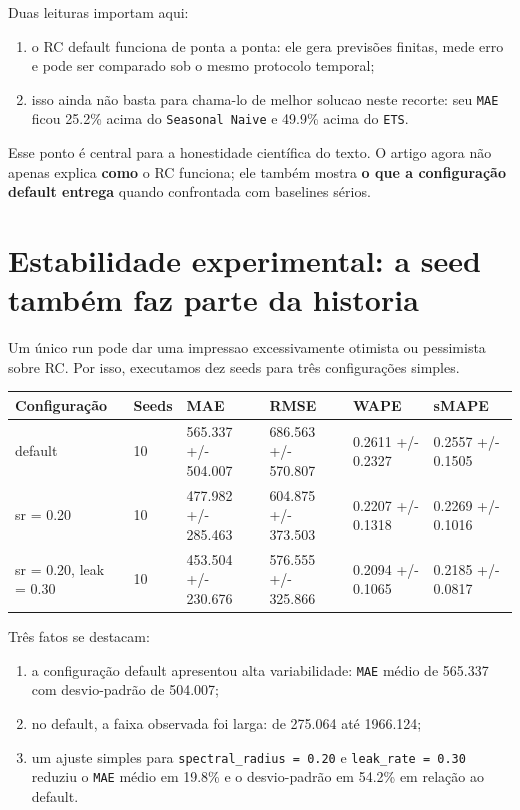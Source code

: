 \documentclass[12pt]{article}
\providecommand{\tightlist}{%
              \setlength{\itemsep}{0pt}\setlength{\parskip}{0pt}}
\begin{document}
Duas leituras importam aqui:

\begin{enumerate}
\def\labelenumi{\arabic{enumi}.}
\tightlist
\item
  o RC default funciona de ponta a ponta: ele gera previsões finitas, mede erro e pode ser comparado sob o mesmo protocolo temporal;
\item
  isso ainda não basta para chama-lo de melhor solucao neste recorte: seu \texttt{MAE} ficou 25.2\% acima do \texttt{Seasonal\ Naive} e 49.9\% acima do \texttt{ETS}.
\end{enumerate}

Esse ponto é central para a honestidade científica do texto. O artigo agora não apenas explica \textbf{como} o RC funciona; ele também mostra \textbf{o que a configuração default entrega} quando confrontada com baselines sérios.

\section{Estabilidade experimental: a seed também faz parte da historia}\label{11-estabilidade-experimental-a-seed-tambuxe9m-faz-parte-da-historia}

Um único run pode dar uma impressao excessivamente otimista ou pessimista sobre RC. Por isso, executamos dez seeds para três configurações simples.

\begin{longtable}[]{@{}llllll@{}}
\toprule\noalign{}
Configuração & Seeds & MAE & RMSE & WAPE & sMAPE \\
\midrule\noalign{}
\endhead
\bottomrule\noalign{}
\endlastfoot
default & 10 & 565.337 +/- 504.007 & 686.563 +/- 570.807 & 0.2611 +/- 0.2327 & 0.2557 +/- 0.1505 \\
sr = 0.20 & 10 & 477.982 +/- 285.463 & 604.875 +/- 373.503 & 0.2207 +/- 0.1318 & 0.2269 +/- 0.1016 \\
sr = 0.20, leak = 0.30 & 10 & 453.504 +/- 230.676 & 576.555 +/- 325.866 & 0.2094 +/- 0.1065 & 0.2185 +/- 0.0817 \\
\end{longtable}

Três fatos se destacam:

\begin{enumerate}
\def\labelenumi{\arabic{enumi}.}
\tightlist
\item
  a configuração default apresentou alta variabilidade: \texttt{MAE} médio de 565.337 com desvio-padrão de 504.007;
\item
  no default, a faixa observada foi larga: de 275.064 até 1966.124;
\item
  um ajuste simples para \texttt{spectral\_radius\ =\ 0.20} e \texttt{leak\_rate\ =\ 0.30} reduziu o \texttt{MAE} médio em 19.8\% e o desvio-padrão em 54.2\% em relação ao default.
\end{enumerate}
\end{document}
